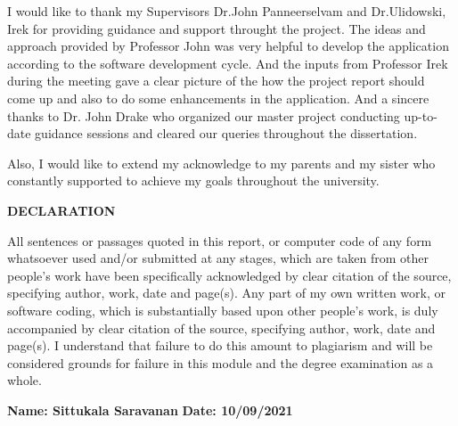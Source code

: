 \cleardoublepage


\begin{acknowledgements}

I would like to thank my Supervisors Dr.John Panneerselvam and Dr.Ulidowski, Irek for providing guidance and support throught the project. The ideas and approach provided by Professor John was very helpful to develop the application according to the software development cycle. And the inputs from Professor Irek during the meeting gave a clear picture of the how the project report should come up and also to do some enhancements in the application. And a sincere thanks to Dr. John Drake who organized our master project conducting up-to-date guidance sessions and cleared our queries throughout the dissertation.

Also, I would like to extend my acknowledge to my parents and my sister who constantly supported to achieve my goals throughout the university.



\begin{center}
  \normalsize\bfseries\MakeUppercase{DECLARATION}
\end{center}

All sentences or passages quoted in this report, or computer code of any form whatsoever used and/or submitted at any stages, which are taken from other people’s work have been specifically acknowledged by clear citation of the source, specifying author, work, date and page(s). Any part of my own written work, or software coding, which is substantially based upon other people’s work, is duly accompanied by clear citation of the source, specifying author, work, date and page(s). I understand that failure to do this amount to plagiarism and will be considered grounds for failure in this module and the degree examination as a whole.\newline

\textbf{Name: Sittukala Saravanan} \newline
\textbf{Date: 10/09/2021}

\end{acknowledgements}